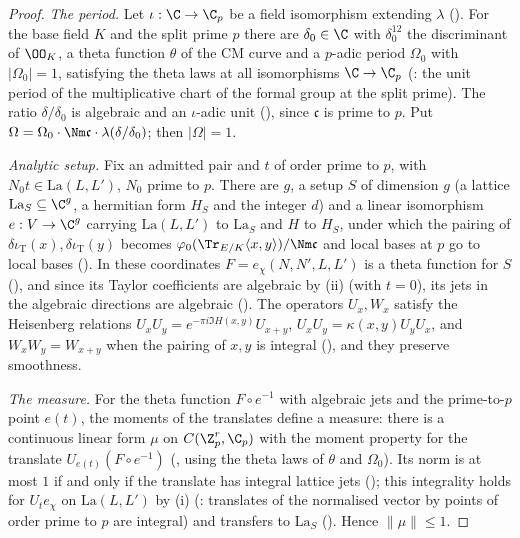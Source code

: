 \begin{proof}
\emph{The period.} Let $\iota:\C\to\C_p$ be a field isomorphism extending $\lambda$
(). For the base field $K$ and the split prime $p$ there are
$\delta_0\in\C$ with $\delta_0^{12}$ the discriminant of $\OO_K$, a theta function $\theta$ of the CM curve and a $p$-adic period
$\Omega_0$ with $|\Omega_0|=1$, satisfying the theta laws at all isomorphisms $\C\to\C_p$
(: the unit period of the multiplicative chart of the formal group at the split prime).
The ratio $\delta/\delta_0$ is algebraic and an $\iota$-adic unit (),
since $\mathfrak c$ is prime to $p$. Put $\Omega=\Omega_0\cdot\Nm\mathfrak c\cdot\lambda(\delta/\delta_0)$; then $|\Omega|=1$.

\emph{Analytic setup.} Fix an admitted pair and $t$ of order prime to $p$, with $N_0t\in\mathrm{La}(L,L')$, $N_0$ prime to $p$.
There are $g$, a setup $S$ of dimension $g$ (a lattice $\mathrm{La}_S\subseteq\C^g$, a hermitian form $H_S$ and the integer $d$)
and a linear isomorphism $e:V\to\C^g$ carrying $\mathrm{La}(L,L')$ to $\mathrm{La}_S$ and $H$ to $H_S$, under
which the pairing of $\delta\iota_{\mathrm T}(x),\delta\iota_{\mathrm T}(y)$ becomes $\varphi_0(\Tr_{E/K}\langle x,y\rangle)/\Nm\mathfrak c$
and local bases at $p$ go to local bases (). In these
coordinates $F=e_\chi(N,N',L,L')$ is a theta function for $S$ (),
and since its Taylor coefficients are algebraic by (ii) (with $t=0$), its jets in the algebraic directions are algebraic
(). The operators $U_x,W_x$ satisfy the Heisenberg relations
$U_xU_y=e^{-\pi i\Im H(x,y)}U_{x+y}$, $U_xU_y=\kappa(x,y)U_yU_x$, and $W_xW_y=W_{x+y}$ when the pairing of $x,y$ is integral
(), and they preserve smoothness.

\emph{The measure.} For the theta function $F\circ e^{-1}$ with algebraic jets and the prime-to-$p$ point $e(t)$, the moments of
the translates define a measure: there is a continuous linear form $\mu$ on $C(\Z_p^r,\C_p)$ with the moment property for the
translate $U_{e(t)}(F\circ e^{-1})$ (, using the theta laws of
$\theta$ and $\Omega_0$). Its norm is at most $1$ if and only if the translate has integral lattice jets
(); this integrality holds for $U_te_\chi$ on
$\mathrm{La}(L,L')$ by (i) (: translates of the normalised
vector by points of order prime to $p$ are integral) and transfers to $\mathrm{La}_S$
(). Hence $\|\mu\|\le1$.


\end{proof}
